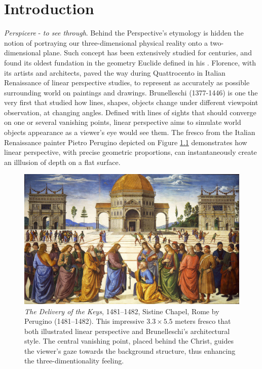 \chapter{Introduction}
\label{chapter:introduction}

{}


\emph{Perspicere} - \textit{to see through}. Behind the Perspective's etymology is hidden the notion of portraying our three-dimensional physical reality onto a two-dimensional plane. Such concept has been extensively studied for centuries, and found its oldest fundation in the geometry Euclide defined in his \cite{euclide}. Florence, with its artists and architects, paved the way during Quattrocento in Italian Renaissance of linear perspective studies, to represent as accurately as possible surrounding world on paintings and drawings. Brunelleschi (1377-1446) is one the very first that studied how lines, shapes, objects change under different viewpoint observation, at changing angles. Defined with lines of sights that should converge on one or several vanishing points, linear perspective aims to simulate world objects appearance as a viewer's eye would see them. The fresco from the Italian Renaissance painter Pietro Perugino depicted on Figure \ref{fig:intro_perugino} demonstrates how linear perspective, with precise geometric proportions, can instantaneously create an illlusion of depth on a flat surface. 

\begin{figure}[h!]
      \begin{center}
      \includegraphics[width=.8\textwidth]{images/introduction/perugino.jpg}
      \end{center}
      \caption{\textit{The Delivery of the Keys}, 1481–1482, Sistine Chapel, Rome by Perugino (1481–1482). This impressive $3.3\times 5.5$ meters fresco that both illustrated linear perspective and Brunelleschi's architectural style. The central vanishing point, placed behind the Christ, guides the viewer's gaze towards the background structure, thus enhancing the three-dimentionality feeling. }
      \label{fig:intro_perugino}
\end{figure}

